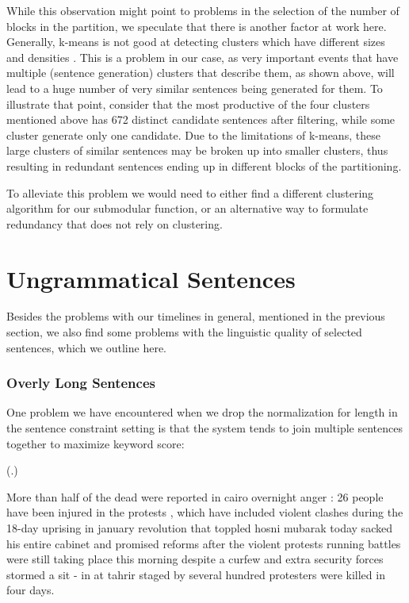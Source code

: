 \documentclass[a4paper,BCOR=10mm]{report}
\newcounter{quotecount}[chapter]
\newcommand{\countquotenosource}[1]{\vspace{1cm}\refstepcounter{quotecount}%
     (\thechapter.\arabic{quotecount}) \hspace*{1cm} \parbox{9cm}{#1}\\[1cm]}
\numberwithin{lemma}{chapter}
\numberwithin{definition}{chapter}
\begin{document}
While this observation might point to problems in the selection of the number of blocks in the partition, we speculate that there is another factor at work here.
Generally, k-means is not good at detecting clusters which have different sizes and densities \citep{introduction-data-mining-tan}.
This is a problem in our case, as very important events that have multiple (sentence generation) clusters that describe them, as shown above, will lead to a huge number of very similar sentences being generated for them. To illustrate that point, consider that the most productive of the four clusters mentioned above has 672 distinct candidate sentences after filtering, while some cluster generate only one candidate.
Due to the limitations of k-means, these large clusters of similar sentences may be broken up into smaller clusters, thus resulting in redundant sentences ending up in different blocks of the partitioning.

To alleviate this problem we would need to either find a different clustering algorithm for our submodular function, or an alternative way to formulate redundancy that does not rely on clustering.

\section{Ungrammatical Sentences} \label{sec:errors-grammar}

Besides the problems with our timelines in general, mentioned in the previous section, we also find some problems with the linguistic quality of selected sentences, which we outline here.

\subsubsection{Overly Long Sentences}

One problem we have encountered when we drop the normalization for length in the sentence constraint setting is that the system tends to join multiple sentences together to maximize keyword score:

\countquotenosource{
More than half of the dead were reported in cairo overnight anger : 26 people have been injured in the protests , which have included violent clashes during the 18-day uprising in january revolution that toppled hosni mubarak today sacked his entire cabinet and promised reforms after the violent protests running battles were still taking place this morning despite a curfew and extra security forces stormed a sit - in at tahrir staged by several hundred protesters were killed in four days.
}
\end{document}
